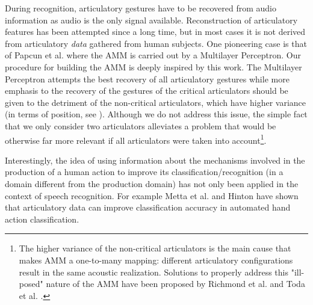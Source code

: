 During recognition, articulatory gestures have to be recovered 
from audio information as audio is the only signal available.
Reconstruction of articulatory features has been attempted since a long
time, but in most cases it is not derived from articulatory \emph{data}
gathered from human subjects. One pioneering case is that of Papcun
et al. \cite{papcun} where the AMM is carried out by a Multilayer Perceptron.
Our procedure for building the AMM is deeply inspired by this work.
The Multilayer Perceptron attempts the best recovery of all articulatory gestures while more emphasis to the recovery of the gestures of the critical articulators should be given to the detriment of the non-critical articulators, which have higher variance (in terms of position, see \cite{papcun,rose}). Although we do not address this issue, the simple fact that we only consider two articulators alleviates a problem that would be otherwise far more relevant if all articulators were taken into account\footnote{The higher variance of the non-critical articulators is the main cause that makes AMM a one-to-many mapping: different articulatory configurations result in the same acoustic realization. Solutions to properly address this "ill-posed" nature of the AMM have been proposed by Richmond et al. \cite{richmond} and Toda et al. \cite{toda}. }.


Interestingly, the idea of using information about the mechanisms involved in the production of a human action to improve its classification/recognition (in a domain different from the production domain) has not only been applied in the context of speech recognition. For example Metta et al. \cite{metta-06} and Hinton \cite{hinton-2006} 
have shown that articulatory data can improve classification accuracy in automated hand action classification.

